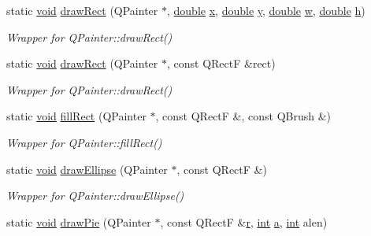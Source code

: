 \begin{DoxyCompactItemize}
\item 
static \hyperlink{group___u_a_v_objects_plugin_ga444cf2ff3f0ecbe028adce838d373f5c}{void} \hyperlink{class_qwt_painter_a0779e2b85c7d04547933574fd2021193}{draw\-Rect} (Q\-Painter $\ast$, \hyperlink{_super_l_u_support_8h_a8956b2b9f49bf918deed98379d159ca7}{double} \hyperlink{glext_8h_a1db9d104e3c2128177f26aff7b46982f}{x}, \hyperlink{_super_l_u_support_8h_a8956b2b9f49bf918deed98379d159ca7}{double} \hyperlink{glext_8h_a42315f3ed8fff752bb47fd782309fcfc}{y}, \hyperlink{_super_l_u_support_8h_a8956b2b9f49bf918deed98379d159ca7}{double} \hyperlink{glext_8h_ac1795f3b2fee217274b85c2750e1a889}{w}, \hyperlink{_super_l_u_support_8h_a8956b2b9f49bf918deed98379d159ca7}{double} \hyperlink{analyze_i_n_s_g_p_s_8m_afcefcf96b3c95673d4739bab1a16e58b}{h})
\begin{DoxyCompactList}\small\item\em Wrapper for Q\-Painter\-::draw\-Rect() \end{DoxyCompactList}\item 
static \hyperlink{group___u_a_v_objects_plugin_ga444cf2ff3f0ecbe028adce838d373f5c}{void} \hyperlink{class_qwt_painter_a838b9cc65ae98ecb40d62ed4281a37b7}{draw\-Rect} (Q\-Painter $\ast$, const Q\-Rect\-F \&rect)
\begin{DoxyCompactList}\small\item\em Wrapper for Q\-Painter\-::draw\-Rect() \end{DoxyCompactList}\item 
static \hyperlink{group___u_a_v_objects_plugin_ga444cf2ff3f0ecbe028adce838d373f5c}{void} \hyperlink{class_qwt_painter_a8f5561421bf2d1c1093059f1b7bba7ba}{fill\-Rect} (Q\-Painter $\ast$, const Q\-Rect\-F \&, const Q\-Brush \&)
\begin{DoxyCompactList}\small\item\em Wrapper for Q\-Painter\-::fill\-Rect() \end{DoxyCompactList}\item 
static \hyperlink{group___u_a_v_objects_plugin_ga444cf2ff3f0ecbe028adce838d373f5c}{void} \hyperlink{class_qwt_painter_a0cce52b66d249859ff71e41edb3637ad}{draw\-Ellipse} (Q\-Painter $\ast$, const Q\-Rect\-F \&)
\begin{DoxyCompactList}\small\item\em Wrapper for Q\-Painter\-::draw\-Ellipse() \end{DoxyCompactList}\item 
static \hyperlink{group___u_a_v_objects_plugin_ga444cf2ff3f0ecbe028adce838d373f5c}{void} \hyperlink{class_qwt_painter_af3a38d38e0909523dbac12cd93ba3122}{draw\-Pie} (Q\-Painter $\ast$, const Q\-Rect\-F \&\hyperlink{glext_8h_abe08814c2f72843fde4d8df41440d5a0}{r}, \hyperlink{ioapi_8h_a787fa3cf048117ba7123753c1e74fcd6}{int} \hyperlink{glext_8h_ac8729153468b5dcf13f971b21d84d4e5}{a}, \hyperlink{ioapi_8h_a787fa3cf048117ba7123753c1e74fcd6}{int} alen)

\end{DoxyCompactItemize}
